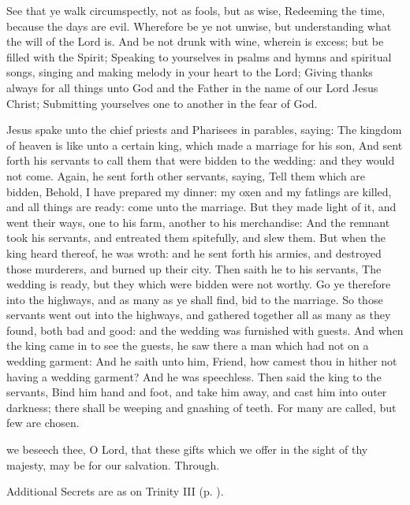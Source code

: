  See that ye walk circumspectly, not as fools, but as wise, Redeeming the time, because the days are evil. Wherefore be ye not unwise, but understanding what the will of the Lord is. And be not drunk with wine, wherein is excess; but be filled with the Spirit; Speaking to yourselves in psalms and hymns and spiritual songs, singing and making melody in your heart to the Lord; Giving thanks always for all things unto God and the Father in the name of our Lord Jesus Christ; Submitting yourselves one to another in the fear of God.


 Jesus spake unto the chief priests and Pharisees in parables, saying: The kingdom of heaven is like unto a certain king, which made a marriage for his son, And sent forth his servants to call them that were bidden to the wedding: and they would not come. Again, he sent forth other servants, saying, Tell them which are bidden, Behold, I have prepared my dinner: my oxen and my fatlings are killed, and all things are ready: come unto the marriage. But they made light of it, and went their ways, one to his farm, another to his merchandise: And the remnant took his servants, and entreated them spitefully, and slew them. But when the king heard thereof, he was wroth: and he sent forth his armies, and destroyed those murderers, and burned up their city. Then saith he to his servants, The wedding is ready, but they which were bidden were not worthy. Go ye therefore into the highways, and as many as ye shall find, bid to the marriage. So those servants went out into the highways, and gathered together all as many as they found, both bad and good: and the wedding was furnished with guests. And when the king came in to see the guests, he saw there a man which had not on a wedding garment: And he saith unto him, Friend, how camest thou in hither not having a wedding garment? And he was speechless. Then said the king to the servants, Bind him hand and foot, and take him away, and cast him into outer darkness; there shall be weeping and gnashing of teeth. For many are called, but few are chosen.

\secret
{} we beseech thee, O Lord, that these gifts which we offer in the sight of thy majesty, may be for our salvation. Through.
\begin{rubric}
    Additional Secrets are as on Trinity III (p. \pageref{TrinityIII}).
\end{rubric}

